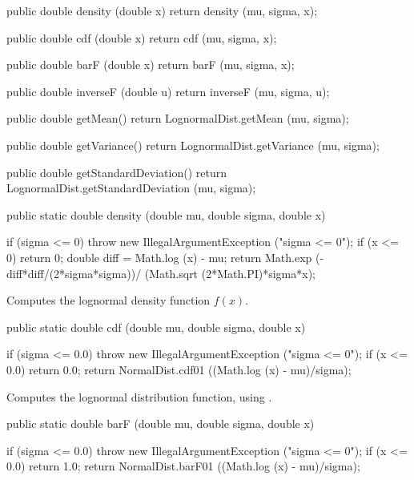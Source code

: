 \begin{code}\begin{hide}

   public double density (double x) {
      return density (mu, sigma, x);
   }

   public double cdf (double x) {
      return cdf (mu, sigma, x);
   }

   public double barF (double x) {
      return barF (mu, sigma, x);
   }

   public double inverseF (double u) {
      return inverseF (mu, sigma, u);
   }

   public double getMean() {
      return LognormalDist.getMean (mu, sigma);
   }

   public double getVariance() {
      return LognormalDist.getVariance (mu, sigma);
   }

   public double getStandardDeviation() {
      return LognormalDist.getStandardDeviation (mu, sigma);
   }\end{hide}

   public static double density (double mu, double sigma, double x)\begin{hide} {
      if (sigma <= 0)
         throw new IllegalArgumentException ("sigma <= 0");
      if (x <= 0)
         return 0;
      double diff = Math.log (x) - mu;
      return Math.exp (-diff*diff/(2*sigma*sigma))/
              (Math.sqrt (2*Math.PI)*sigma*x);
   }\end{hide}
\end{code}
\begin{tabb} Computes the lognormal density function
  $f(x)$.
\end{tabb}
\begin{code}

   public static double cdf (double mu, double sigma, double x)\begin{hide} {
      if (sigma <= 0.0)
        throw new IllegalArgumentException ("sigma  <= 0");
      if (x <= 0.0)
         return 0.0;
      return NormalDist.cdf01 ((Math.log (x) - mu)/sigma);
   }\end{hide}
\end{code}
 \begin{tabb}
  Computes the lognormal distribution function, using
 .
 \end{tabb}
\begin{code}

   public static double barF (double mu, double sigma, double x)\begin{hide} {
      if (sigma <= 0.0)
        throw new IllegalArgumentException ("sigma  <= 0");
      if (x <= 0.0)
         return 1.0;
      return NormalDist.barF01 ((Math.log (x) - mu)/sigma);
   }\end{hide}
\end{code}
